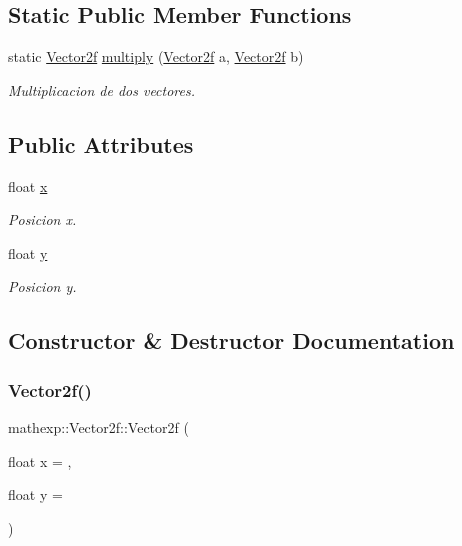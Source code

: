 \subsection*{Static Public Member Functions}
\begin{DoxyCompactItemize}
\item 
static \mbox{\hyperlink{structmathexp_1_1_vector2f}{Vector2f}} \mbox{\hyperlink{structmathexp_1_1_vector2f_a569f4a6e3ff94f19df81ca267e33fbad}{multiply}} (\mbox{\hyperlink{structmathexp_1_1_vector2f}{Vector2f}} a, \mbox{\hyperlink{structmathexp_1_1_vector2f}{Vector2f}} b)
\begin{DoxyCompactList}\small\item\em Multiplicacion de dos vectores. \end{DoxyCompactList}\end{DoxyCompactItemize}
\subsection*{Public Attributes}
\begin{DoxyCompactItemize}
\item 
float \mbox{\hyperlink{structmathexp_1_1_vector2f_a23439427fa69b2e7cd68101c960ccffd}{x}}
\begin{DoxyCompactList}\small\item\em Posicion x. \end{DoxyCompactList}\item 
float \mbox{\hyperlink{structmathexp_1_1_vector2f_ac757b6e37f124a0d6719c0bcb01207ad}{y}}
\begin{DoxyCompactList}\small\item\em Posicion y. \end{DoxyCompactList}\end{DoxyCompactItemize}


\subsection{Constructor \& Destructor Documentation}
\mbox{\label{structmathexp_1_1_vector2f_a13ca2a083824bbe2641d406952dcf307}} 
\subsubsection{\texorpdfstring{Vector2f()}{Vector2f()}\hspace{0.1cm}{\footnotesize\ttfamily [1/2]}}
{\footnotesize\ttfamily mathexp\+::\+Vector2f\+::\+Vector2f (\begin{DoxyParamCaption}\item[{float}]{x = {},  }\item[{float}]{y = {} }\end{DoxyParamCaption})}



